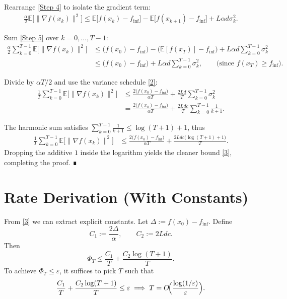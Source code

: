 \documentclass{article}
\begin{document}
Rearrange \eqref{Step 4} to isolate the gradient term:
\begin{align}
\frac{\alpha}{2}\mathbb{E}\!\bigl[\|\nabla f(x_{k})\|^{2}\bigr]
\le \mathbb{E}\!\bigl[f(x_{k})-f_{\inf}\bigr]
-\mathbb{E}\!\bigl[f(x_{k+1})-f_{\inf}\bigr]
+L\alpha d\sigma_{k}^{2}. \tag{Step 5}
\end{align}

Sum \eqref{Step 5} over $k=0,\dots,T-1$:
\begin{align}
\frac{\alpha}{2}\sum_{k=0}^{T-1}\mathbb{E}\!\bigl[\|\nabla f(x_{k})\|^{2}\bigr]
&\le \bigl(f(x_{0})-f_{\inf}\bigr)
-\bigl(\mathbb{E}[f(x_{T})]-f_{\inf}\bigr)
+L\alpha d\sum_{k=0}^{T-1}\sigma_{k}^{2} \tag{Step 6}\\[4pt]
&\le \bigl(f(x_{0})-f_{\inf}\bigr)
+L\alpha d\sum_{k=0}^{T-1}\sigma_{k}^{2},
\qquad\text{(since }f(x_{T})\ge f_{\inf}\text{)}. \tag{Step 7}
\end{align}

Divide by $\alpha T/2$ and use the variance schedule \eqref{2}:
\begin{align}
\frac{1}{T}\sum_{k=0}^{T-1}\mathbb{E}\!\bigl[\|\nabla f(x_{k})\|^{2}\bigr]
&\le \frac{2\bigl(f(x_{0})-f_{\inf}\bigr)}{\alpha T}
+\frac{2L d}{T}\sum_{k=0}^{T-1}\sigma_{k}^{2} \tag{Step 8}\\[4pt]
&= \frac{2\bigl(f(x_{0})-f_{\inf}\bigr)}{\alpha T}
+\frac{2L d c}{T}\sum_{k=0}^{T-1}\frac{1}{k+1}. \tag{Step 9}
\end{align}

The harmonic sum satisfies $\sum_{k=0}^{T-1}\frac{1}{k+1}\le \log (T+1)+1$, thus
\begin{align}
\frac{1}{T}\sum_{k=0}^{T-1}\mathbb{E}\!\bigl[\|\nabla f(x_{k})\|^{2}\bigr]
&\le \frac{2\bigl(f(x_{0})-f_{\inf}\bigr)}{\alpha T}
+\frac{2L d c\bigl(\log (T+1)+1\bigr)}{T}. \tag{Step 10}
\end{align}
Dropping the additive $1$ inside the logarithm yields the cleaner bound \eqref{3}, completing the proof. ∎

\section*{Rate Derivation (With Constants)}
From \eqref{3} we can extract explicit constants. Let $\Delta:=f(x_{0})-f_{\inf}$.
Define
\[
C_{1}:=\frac{2\Delta}{\alpha},\qquad 
C_{2}:=2L d c .
\]
Then
\[
\Phi_{T}\le \frac{C_{1}}{T}+\frac{C_{2}\log (T+1)}{T}.
\]
To achieve $\Phi_{T}\le\varepsilon$, it suffices to pick $T$ such that
\[
\frac{C_{1}}{T}+\frac{C_{2}\log (T+1)}{T}\le\varepsilon
\;\Longrightarrow\;
T=O\!\Bigl(\frac{\log (1/\varepsilon)}{\varepsilon}\Bigr).
\]
\end{document}
